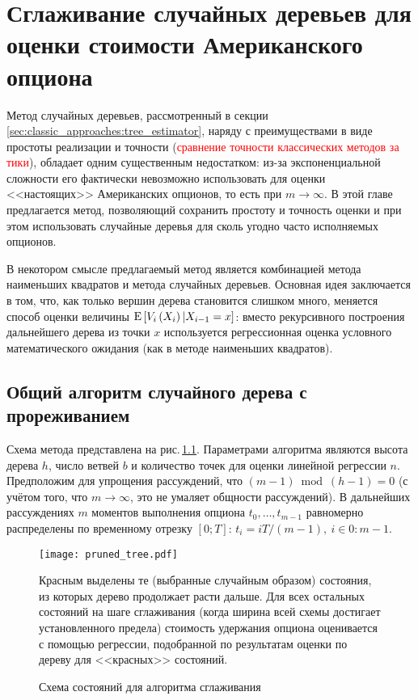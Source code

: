 \chapter{Сглаживание случайных деревьев для оценки стоимости Американского опциона} %
\label{cha:tree_pruning_for_american_option}

Метод случайных деревьев, рассмотренный в секции \ref{sec:classic_approaches:tree_estimator}, наряду с преимуществами в виде простоты реализации и точности (\textcolor{red}{сравнение точности классических методов за тики}), обладает одним существенным недостатком: из-за экспоненциальной сложности его фактически невозможно использовать для оценки <<настоящих>> Американских опционов, то есть при $m \to \infty$. В этой главе предлагается метод, позволяющий сохранить простоту и точность оценки и при этом использовать случайные деревья для сколь угодно часто исполняемых опционов.

В некотором смысле предлагаемый метод является комбинацией метода наименьших квадратов и метода случайных деревьев. Основная идея заключается в том, что, как только вершин дерева становится слишком много, меняется способ оценки величины $\mathrm{E}\left[V_i\left(X_i\right)|X_{i-1}=x\right]$: вместо рекурсивного построения дальнейшего дерева из точки $x$ используется регрессионная оценка условного математического ожидания (как в методе наименьших квадратов).

\section{Общий алгоритм случайного дерева с прореживанием} %
\label{sec:tree_pruning:general_algorithm}

Схема метода представлена на рис.\,\ref{fig:pruned_tree}. Параметрами алгоритма являются высота дерева $h$, число ветвей $b$ и количество точек для оценки линейной регрессии $n$. Предположим для упрощения рассуждений, что $(m-1) \bmod (h-1) = 0$ (с учётом того, что $m \to \infty$, это не умаляет общности рассуждений). В дальнейших рассуждениях $m$ моментов выполнения опциона $t_0, \dots, t_{m-1}$ равномерно распределены по временному отрезку ${[0; T]}$: $t_i = i T / (m-1), \: i\in 0\mathbin{:} {m-1}$. 

\begin{figure}[h!]
    \centering
    \texttt{[image: pruned\_tree.pdf]}
    \caption{Схема состояний для алгоритма сглаживания}
    \label{fig:pruned_tree}
    \footnotesize
    Красным выделены те (выбранные случайным образом) состояния, из которых дерево продолжает расти дальше. Для всех остальных состояний на шаге сглаживания (когда ширина всей схемы достигает установленного предела) стоимость удержания опциона оценивается с помощью регрессии, подобранной по результатам оценки по дереву для <<красных>> состояний.
\end{figure}


